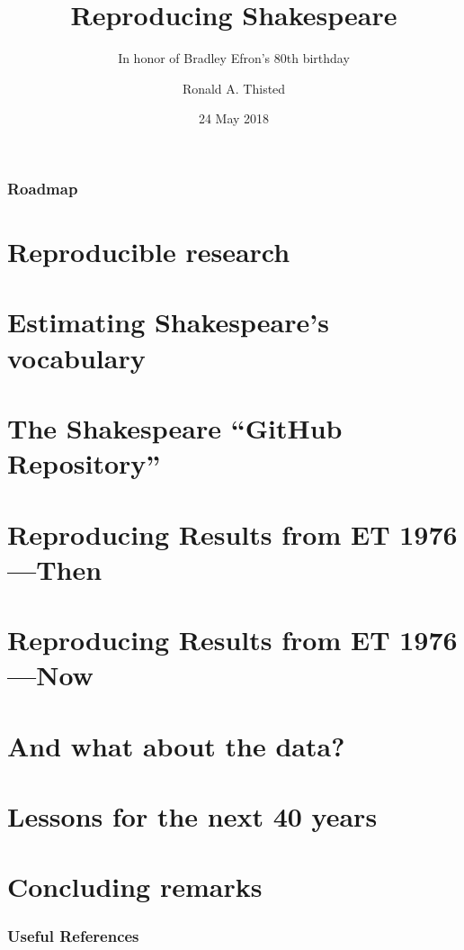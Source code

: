 \documentclass[xcolor=dvipsnames]{beamer}
\title[]
{Reproducing Shakespeare}
\subtitle
{In honor of Bradley Efron's 80th birthday}
\author{Ronald A. Thisted}
\institute[The University of Chicago] %
{
  Departments of Statistics and Public Health Sciences\\
  The University of Chicago
}
\date
{24 May 2018}
\begin{document}
\begin{frame}
  \titlepage
\end{frame}

\begin{frame}
  \frametitle{Roadmap}
  \tableofcontents
\end{frame}

	
\section[Repro Res]{Reproducible research}
	
\section[S's vocabulary]{Estimating Shakespeare's vocabulary}
	
	
\section[GitHub 1976]{The Shakespeare ``GitHub Repository''}
	
	
\section[Then]{Reproducing Results from ET 1976---Then}
	
	
	
	
	
	
\section[Now]{Reproducing Results from ET 1976---Now}
	
	
	
\section[Data]{And what about the data?}
	
\section[Lessons]{Lessons for the next 40 years}
	
\section[Finally]{Concluding remarks}
	

%	



\begin{frame}
    \frametitle{Useful References}\tiny
       
\end{frame}
\nocite{Spevack:1968qd,Efron:1976zs,knuth1984literate,Gani:1976rg,Buckheit:1995hl}
\end{document}
